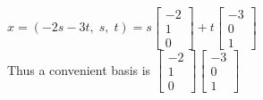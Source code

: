 \documentclass{article}
\begin{document}
\begin{multicols*}{2}
\\$x=(-2s-3t,\;s,\;t)=s\begin{bmatrix}-2\\1\\0\end{bmatrix}+t\begin{bmatrix}-3\\0\\1\end{bmatrix}$
\\Thus a convenient basis is $\begin{bmatrix}-2\\1\\0\end{bmatrix} \begin{bmatrix}-3\\0\\1\end{bmatrix}$
\end{multicols*}
\pagebreak
\end{document}
